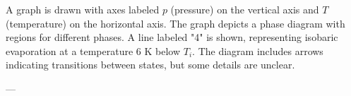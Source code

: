 A graph is drawn with axes labeled \( p \) (pressure) on the vertical axis and \( T \) (temperature) on the horizontal axis. The graph depicts a phase diagram with regions for different phases. A line labeled "4" is shown, representing isobaric evaporation at a temperature 6 K below \( T_i \). The diagram includes arrows indicating transitions between states, but some details are unclear.

---